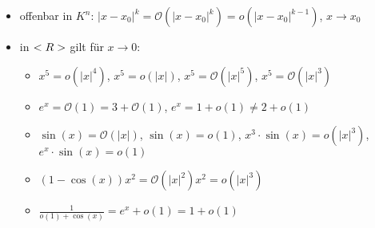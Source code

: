 \begin{example}
	\begin{itemize}
		\item offenbar in $K^n$: $\vert x-x_0\vert^k=\mathcal{O}(\vert x-x_0\vert^k)=o(\vert x-x_0\vert^{k-1})$, $x\to x_0$
		\item in $<R>$ gilt für $x\to 0$:
		\begin{itemize}
			\item $x^5=o(\vert x\vert^4)$, $x^5=o(\vert x\vert)$, $x^5=\mathcal{O}(\vert x\vert^5)$, $x^5=\mathcal{O}(\vert x\vert^3)$
			\item $e^x=\mathcal{O}(1)=3+\mathcal{O}(1)$, $e^x=1+o(1)\neq 2+o(1)$
			\item $\sin(x)=\mathcal{O}(\vert x\vert)$, $\sin(x)=o(1)$, $x^3\cdot\sin(x)=o(\vert x\vert^3)$, $e^x\cdot \sin(x)=o(1)$
			\item $(1-\cos(x))x^2=\mathcal{O}(\vert x\vert^2)x^2=o(\vert x\vert^3)$
			\item $\frac{1}{o(1)+\cos(x)}=e^x+o(1)=1+o(1)$
		\end{itemize}
	\end{itemize}
\end{example}